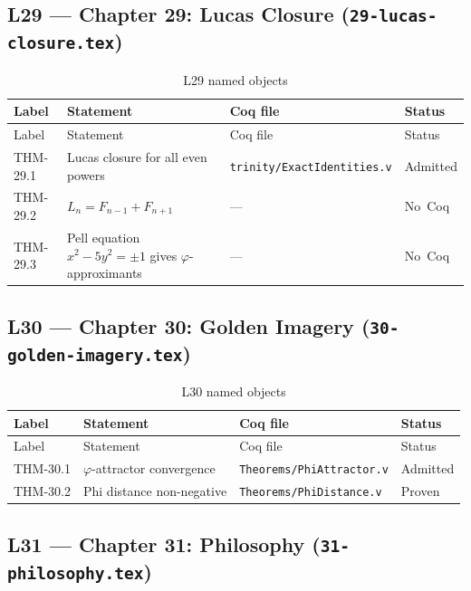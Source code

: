 \subsection{L29 — Chapter 29: Lucas Closure
  (\texttt{29-lucas-closure.tex})}
\label{sec:A-L29}

\begin{longtable}{lp{6cm}ll}
\toprule
Label & Statement & Coq file & Status \\
\midrule
\endfirsthead
\toprule
Label & Statement & Coq file & Status \\
\midrule
\endhead
\bottomrule
\endfoot
\bottomrule
\caption{L29 named objects}
\endlastfoot
THM-29.1 & Lucas closure for all even powers &
  \texttt{trinity/ExactIdentities.v} & Admitted \\
THM-29.2 & $L_n = F_{n-1}+F_{n+1}$ & --- & No~Coq \\
THM-29.3 &
  Pell equation $x^{2}-5y^{2}=\pm 1$ gives
  $\varphi$-approximants & --- & No~Coq \\
\end{longtable}

\subsection{L30 — Chapter 30: Golden Imagery
  (\texttt{30-golden-imagery.tex})}
\label{sec:A-L30}

\begin{longtable}{lp{6cm}ll}
\toprule
Label & Statement & Coq file & Status \\
\midrule
\endfirsthead
\toprule
Label & Statement & Coq file & Status \\
\midrule
\endhead
\bottomrule
\endfoot
\bottomrule
\caption{L30 named objects}
\endlastfoot
THM-30.1 & $\varphi$-attractor convergence &
  \texttt{Theorems/PhiAttractor.v} & Admitted \\
THM-30.2 & Phi distance non-negative &
  \texttt{Theorems/PhiDistance.v} & Proven \\
\end{longtable}

\subsection{L31 — Chapter 31: Philosophy (\texttt{31-philosophy.tex})}
\label{sec:A-L31}

